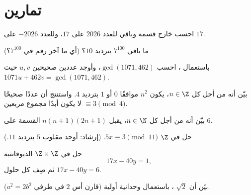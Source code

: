 \section{تمارين}

\begin{exercise}[$\star$]\label{exo:g12:arith:1}
احسب خارج قسمة وباقي  للعدد $2026$ على
$17$، وللعدد $-2026$ على $17$.
\end{exercise}

\begin{exercise}[$\star$]\label{exo:g12:arith:2}
ما باقي $7^{100}$ بترديد $10$؟ (أي ما آخر رقم في
$7^{100}$؟)
\end{exercise}

\begin{exercise}[$\star$]\label{exo:g12:arith:3}
باستعمال ، احسب $\gcd(1071, 462)$، وأوجد عددين صحيحين
$u, v$ حيث $1071u + 462v = \gcd(1071, 462)$.
\end{exercise}

\begin{exercise}[$\star$]\label{exo:g12:arith:4}
بيّن أنه من أجل كل $n \in \Z$، يكون $n^2$ موافقًا $0$ أو $1$ بترديد
$4$. واستنتج أن عددًا صحيحًا $\equiv 3 \pmod 4$ لا يكون أبدًا مجموع مربعين.
\end{exercise}

\begin{exercise}[$\star\star$]\label{exo:g12:arith:5}
بيّن أنه من أجل كل $n \in \N$، يقبل $n(n+1)(2n+1)$ القسمة على $6$.
\end{exercise}

\begin{exercise}[$\star\star$]\label{exo:g12:arith:6}
حل في $\Z$  $5x \equiv 3 \pmod{11}$.
(إرشاد: أوجد مقلوب $5$ بترديد $11$.)
\end{exercise}

\begin{exercise}[$\star\star$]\label{exo:g12:arith:7}
حل في $\Z \times \Z$  الديوفانتية
\[
17x - 40y = 1,
\]
ثم صِف كل حلول $17x - 40y = 6$.
\end{exercise}

\begin{exercise}[$\star\star$]\label{exo:g12:arith:8}
بيّن أن $\sqrt2$ ، باستعمال وحدانية 
أولية (قارن أس $2$ في طرفي $a^2 = 2b^2$).
\end{exercise}

